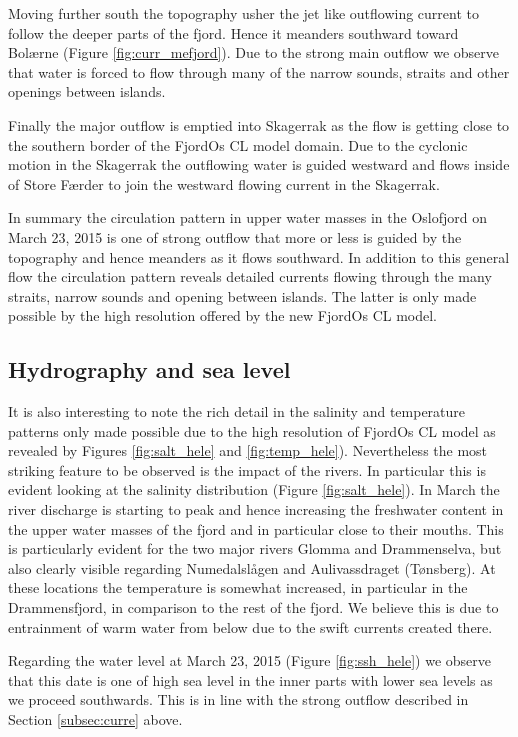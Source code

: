 Moving further south the topography usher the jet like outflowing current to follow the deeper parts of the fjord. Hence it meanders southward toward Bol{\ae}rne (Figure \ref{fig:curr_mefjord}). Due to the strong main outflow we observe that water is forced to flow through many of the narrow sounds, straits and other openings between islands.    
  

Finally the major outflow is emptied into Skagerrak as the flow is getting close to the southern border of the FjordOs CL model domain. Due to the cyclonic motion in the Skagerrak the outflowing water is guided westward and flows inside of Store F{\ae}rder to join the westward flowing current in the Skagerrak.    

In summary the circulation pattern in upper water masses in the Oslofjord on March 23, 2015 is one of strong outflow that more or less is guided by the topography and hence meanders as it flows southward. In addition to this general flow the circulation pattern reveals detailed currents flowing through the many straits, narrow sounds and opening between islands. The latter is only made possible by the high resolution offered by the new FjordOs CL model.

\clearpage
\subsection{Hydrography and sea level}
\label{subsec:hydro}
It is also interesting to note the rich detail in the salinity and temperature patterns only made possible due to the high resolution of FjordOs CL model as revealed by Figures \ref{fig:salt_hele} and \ref{fig:temp_hele}). Nevertheless the most striking feature to be observed is the impact of the rivers. In particular this is evident looking at the salinity distribution (Figure \ref{fig:salt_hele}). In March the river discharge is starting to peak and hence increasing the freshwater content in the upper water masses of the fjord and in particular close to their mouths. This is particularly evident for the two major rivers Glomma and Drammenselva, but also clearly visible regarding Numedalsl{\aa}gen and Aulivassdraget (T{\o}nsberg). At these locations the temperature is somewhat increased, in particular in the Drammensfjord, in comparison to the rest of the fjord. We believe this is due to entrainment of warm water from below due to the swift currents created there.

Regarding the water level at March 23, 2015 (Figure \ref{fig:ssh_hele}) we observe that this date is one of high sea level in the inner parts with lower sea levels as we proceed southwards. This is in line with the strong outflow described in Section \ref{subsec:curre} above.
   
  
   
\clearpage
